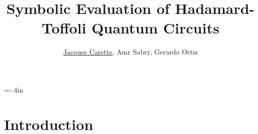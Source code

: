 \documentclass{beamer}
\title[\pgfuseimage{logo}] %
{Symbolic Evaluation of Hadamard-Toffoli Quantum Circuits}
\author[]{\underline{Jacques Carette}, Amr Sabry, Gerardo Ortiz}
\begin{document}
%

\hoffset=-.4in %
\begin{frame}[plain]

\titlepage

\end{frame}
\hoffset=0in %


\section[Introduction]{Introduction}

\end{document}
